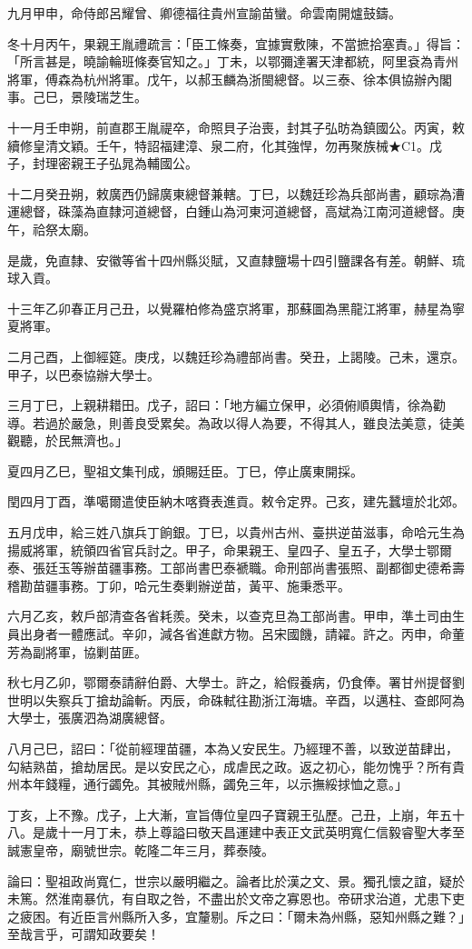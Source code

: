 \begin{pinyinscope}
九月甲申，命侍郎呂耀曾、卿德福往貴州宣諭苗蠻。命雲南開爐鼓鑄。

冬十月丙午，果親王胤禮疏言：「臣工條奏，宜據實敷陳，不當摭拾塞責。」得旨：「所言甚是，曉諭輪班條奏官知之。」丁未，以鄂彌達署天津都統，阿里袞為青州將軍，傅森為杭州將軍。戊午，以郝玉麟為浙閩總督。以三泰、徐本俱協辦內閣事。己巳，景陵瑞芝生。

十一月壬申朔，前直郡王胤禔卒，命照貝子治喪，封其子弘昉為鎮國公。丙寅，敕續修皇清文穎。壬午，特詔福建漳、泉二府，化其強悍，勿再聚族械★C1。戊子，封理密親王子弘晁為輔國公。

十二月癸丑朔，敕廣西仍歸廣東總督兼轄。丁巳，以魏廷珍為兵部尚書，顧琮為漕運總督，硃藻為直隸河道總督，白鍾山為河東河道總督，高斌為江南河道總督。庚午，祫祭太廟。

是歲，免直隸、安徽等省十四州縣災賦，又直隸鹽場十四引鹽課各有差。朝鮮、琉球入貢。

十三年乙卯春正月己丑，以覺羅柏修為盛京將軍，那蘇圖為黑龍江將軍，赫星為寧夏將軍。

二月己酉，上御經筵。庚戌，以魏廷珍為禮部尚書。癸丑，上謁陵。己未，還京。甲子，以巴泰協辦大學士。

三月丁巳，上親耕耤田。戊子，詔曰：「地方編立保甲，必須俯順輿情，徐為勸導。若過於嚴急，則善良受累矣。為政以得人為要，不得其人，雖良法美意，徒美觀聽，於民無濟也。」

夏四月乙巳，聖祖文集刊成，頒賜廷臣。丁巳，停止廣東開採。

閏四月丁酉，準噶爾遣使臣納木喀賚表進貢。敕令定界。己亥，建先蠶壇於北郊。

五月戊申，給三姓八旗兵丁餉銀。丁巳，以貴州古州、臺拱逆苗滋事，命哈元生為揚威將軍，統領四省官兵討之。甲子，命果親王、皇四子、皇五子，大學士鄂爾泰、張廷玉等辦苗疆事務。工部尚書巴泰褫職。命刑部尚書張照、副都御史德希壽稽勘苗疆事務。丁卯，哈元生奏剿辦逆苗，黃平、施秉悉平。

六月乙亥，敕戶部清查各省耗羨。癸未，以查克旦為工部尚書。甲申，準土司由生員出身者一體應試。辛卯，減各省進獻方物。呂宋國饑，請糴。許之。丙申，命董芳為副將軍，協剿苗匪。

秋七月乙卯，鄂爾泰請辭伯爵、大學士。許之，給假養病，仍食俸。署甘州提督劉世明以失察兵丁搶劫論斬。丙辰，命硃軾往勘浙江海塘。辛酉，以邁柱、查郎阿為大學士，張廣泗為湖廣總督。

八月己巳，詔曰：「從前經理苗疆，本為乂安民生。乃經理不善，以致逆苗肆出，勾結熟苗，搶劫居民。是以安民之心，成虐民之政。返之初心，能勿愧乎？所有貴州本年錢糧，通行蠲免。其被賊州縣，蠲免三年，以示撫綏捄恤之意。」

丁亥，上不豫。戊子，上大漸，宣旨傳位皇四子寶親王弘歷。己丑，上崩，年五十八。是歲十一月丁未，恭上尊謚曰敬天昌運建中表正文武英明寬仁信毅睿聖大孝至誠憲皇帝，廟號世宗。乾隆二年三月，葬泰陵。

論曰：聖祖政尚寬仁，世宗以嚴明繼之。論者比於漢之文、景。獨孔懷之誼，疑於未篤。然淮南暴伉，有自取之咎，不盡出於文帝之寡恩也。帝研求治道，尤患下吏之疲困。有近臣言州縣所入多，宜釐剔。斥之曰：「爾未為州縣，惡知州縣之難？」至哉言乎，可謂知政要矣！


\end{pinyinscope}